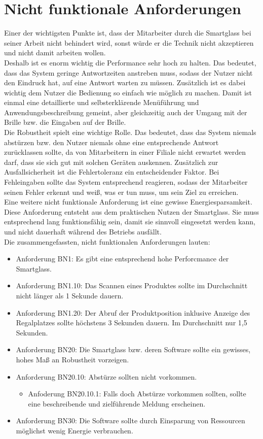 \section{Nicht funktionale Anforderungen}
Einer der wichtigsten Punkte ist, dass der Mitarbeiter durch die Smartglass bei seiner Arbeit nicht behindert wird, sonst würde er die Technik nicht akzeptieren und nicht damit arbeiten wollen. \\
Deshalb ist es enorm wichtig die Performance sehr hoch zu halten. Das bedeutet, dass das System geringe Antwortzeiten anstreben muss, sodass der Nutzer nicht den Eindruck hat, auf eine Antwort warten zu müssen. 
Zusätzlich ist es dabei wichtig dem Nutzer die Bedienung so einfach wie möglich zu machen. Damit ist einmal eine detaillierte und selbsterklärende Menüführung und Anwendungsbeschreibung gemeint, aber gleichzeitig auch der Umgang mit der Brille bzw. die Eingaben auf der Brille. \\
Die Robustheit spielt eine wichtige Rolle. Das bedeutet, dass das System niemals abstürzen bzw. den Nutzer niemals ohne eine entsprechende Antwort zurücklassen sollte, da von Mitarbeitern in einer Filiale nicht erwartet werden darf, dass sie sich gut mit solchen Geräten auskennen. Zusätzlich zur Ausfallsicherheit ist die Fehlertoleranz ein entscheidender Faktor. Bei Fehleingaben sollte das System entsprechend reagieren, sodass der Mitarbeiter seinen Fehler erkennt und weiß, was er tun muss, um sein Ziel zu erreichen. \\
Eine weitere nicht funktionale Anforderung ist eine gewisse Energiesparsamkeit. Diese Anforderung entsteht aus dem praktischen Nutzen der Smartglass. Sie muss entsprechend lang funktionsfähig sein, damit sie sinnvoll eingesetzt werden kann, und nicht dauerhaft während des Betriebs ausfällt. 
\\
Die zusammengefassten, nicht funktionalen Anforderungen lauten:
\begin{itemize}
	\item Anforderung BN1: Es gibt eine entsprechend hohe Perforcmance der Smartglass. 
	\item Anforderung BN1.10: Das Scannen eines Produktes sollte im Durchschnitt nicht länger als 1 Sekunde dauern. 
	\item Anforderung BN1.20: Der Abruf der Produktposition inklusive Anzeige des Regalplatzes sollte höchstens 3 Sekunden dauern. Im Durchschnitt nur 1,5 Sekunden.
	\item Anforderung BN20: Die Smartglass bzw. deren Software sollte ein gewisses, hohes Maß an Robustheit vorzeigen.
	\item Anforderung BN20.10: Abstürze sollten nicht vorkommen. 
	\begin{itemize}
		\item Anfoderung BN20.10.1: Falls doch Abstürze vorkommen sollten, sollte eine beschreibende und zielführende Meldung erscheinen.
	\end{itemize}
	\item Anforderung BN30: Die Software sollte durch Einsparung von Ressourcen möglichst wenig Energie verbrauchen.
\end{itemize}


